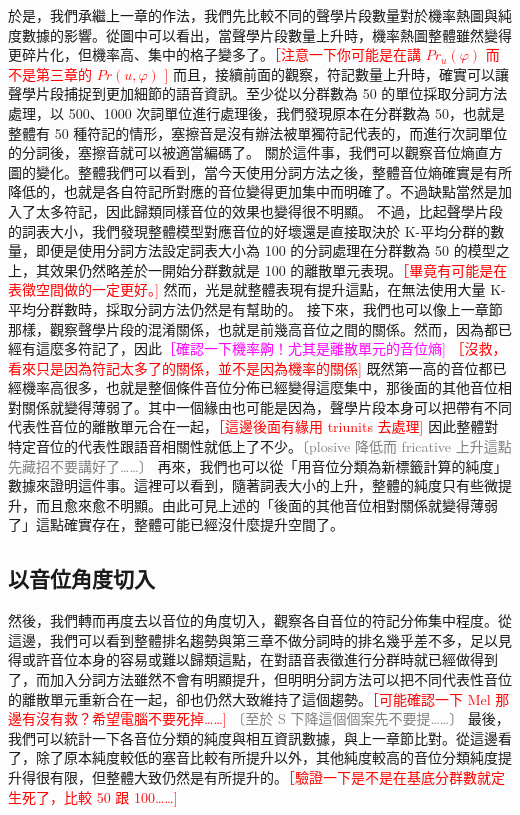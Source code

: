         於是，我們承繼上一章的作法，我們先比較不同的聲學片段數量對於機率熱圖與純度數據的影響。從圖中可以看出，當聲學片段數量上升時，機率熱圖整體雖然變得更碎片化，但機率高、集中的格子變多了。\textcolor{red}{［注意一下你可能是在講 $Pr_u(\varphi)$ 而不是第三章的 $Pr(u, \varphi)$ ] }
        而且，接續前面的觀察，符記數量上升時，確實可以讓聲學片段捕捉到更加細節的語音資訊。至少從以分群數為 50 的單位採取分詞方法處理，以 500、1000 次詞單位進行處理後，我們發現原本在分群數為 50，也就是整體有 50 種符記的情形，塞擦音是沒有辦法被單獨符記代表的，而進行次詞單位的分詞後，塞擦音就可以被適當編碼了。
        關於這件事，我們可以觀察音位熵直方圖的變化。整體我們可以看到，當今天使用分詞方法之後，整體音位熵確實是有所降低的，也就是各自符記所對應的音位變得更加集中而明確了。不過缺點當然是加入了太多符記，因此歸類同樣音位的效果也變得很不明顯。
        不過，比起聲學片段的詞表大小，我們發現整體模型對應音位的好壞還是直接取決於 K-平均分群的數量，即便是使用分詞方法設定詞表大小為 100 的分詞處理在分群數為 50 的模型之上，其效果仍然略差於一開始分群數就是 100 的離散單元表現。\textcolor{red}{［畢竟有可能是在表徵空間做的一定更好。] }然而，光是就整體表現有提升這點，在無法使用大量 K-平均分群數時，採取分詞方法仍然是有幫助的。
        接下來，我們也可以像上一章節那樣，觀察聲學片段的混淆關係，也就是前幾高音位之間的關係。然而，因為都已經有這麼多符記了，因此\textcolor{magenta}{［確認一下機率齁！尤其是離散單元的音位熵] } \textcolor{red}{［沒救，看來只是因為符記太多了的關係，並不是因為機率的關係] }既然第一高的音位都已經機率高很多，也就是整個條件音位分佈已經變得這麼集中，那後面的其他音位相對關係就變得薄弱了。其中一個緣由也可能是因為，聲學片段本身可以把帶有不同代表性音位的離散單元合在一起，\textcolor{red}{［這邊後面有緣用 triunits 去處理] } 因此整體對特定音位的代表性跟語音相關性就低上了不少。\textcolor{gray}{〔plosive 降低而 fricative 上升這點先藏招不要講好了……〕 }
        再來，我們也可以從「用音位分類為新標籤計算的純度」數據來證明這件事。這裡可以看到，隨著詞表大小的上升，整體的純度只有些微提升，而且愈來愈不明顯。由此可見上述的「後面的其他音位相對關係就變得薄弱了」這點確實存在，整體可能已經沒什麼提升空間了。

\subsection{以音位角度切入}

        然後，我們轉而再度去以音位的角度切入，觀察各自音位的符記分佈集中程度。從這邊，我們可以看到整體排名趨勢與第三章不做分詞時的排名幾乎差不多，足以見得或許音位本身的容易或難以歸類這點，在對語音表徵進行分群時就已經做得到了，而加入分詞方法雖然不會有明顯提升，但明明分詞方法可以把不同代表性音位的離散單元重新合在一起，卻也仍然大致維持了這個趨勢。\textcolor{red}{［可能確認一下 Mel 那邊有沒有救？希望電腦不要死掉……] }\textcolor{gray}{〔至於 S 下降這個個案先不要提……〕 }
        最後，我們可以統計一下各音位分類的純度與相互資訊數據，與上一章節比對。從這邊看了，除了原本純度較低的塞音比較有所提升以外，其他純度較高的音位分類純度提升得很有限，但整體大致仍然是有所提升的。\textcolor{red}{［驗證一下是不是在基底分群數就定生死了，比較 50 跟 100……] }

